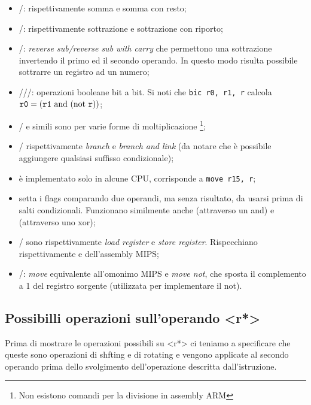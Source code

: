 \documentclass[class=book, crop=false, oneside]{standalone}
\begin{document}
\begin{itemize}
	\item {}/: rispettivamente somma e somma con resto;
	\item {}/: rispettivamente sottrazione e sottrazione con riporto;
	\item {}/: \emph{reverse sub/reverse sub with carry} che permettono una sottrazione invertendo il primo ed il secondo operando. In questo modo risulta possibile sottrarre un registro ad un numero;
	\item {}///: operazioni booleane bit a bit. Si noti che \texttt{bic r0, r1, r} calcola \(\texttt{r0} = (\texttt{r1} \textrm{ and } (\textrm{not } \texttt{r}))\);
	\item {}/ e simili sono per varie forme di moltiplicazione \footnote{Non esistono comandi per la divisione in assembly ARM};
	\item {}/ rispettivamente \emph{branch} e \emph{branch and link} (da notare che è possibile aggiungere qualsiasi suffisso condizionale);
	\item {} è implementato solo in alcune CPU, corrisponde a \texttt{move r15, r};
	\item {} setta i flags comparando due operandi, ma senza risultato, da usarsi prima di salti condizionali. Funzionano similmente anche  (attraverso un and) e  (attraverso uno xor);
	\item {}/ sono rispettivamente \emph{load register} e \emph{store register}. Rispecchiano rispettivamente  e  dell'assembly MIPS;
	\item {}/: \emph{move} equivalente all'omonimo MIPS e \emph{move not}, che sposta il complemento a 1 del registro sorgente (utilizzata per implementare il not).
\end{itemize}
\subsection{Possibilli operazioni sull'operando <r*>}\label{sec:modifiche}
Prima di mostrare le operazioni possibili su <r*> ci teniamo a specificare che queste sono operazioni di shfting e di rotating e vengono applicate al secondo operando prima dello svolgimento dell'operazione descritta dall'istruzione.
\end{document}
